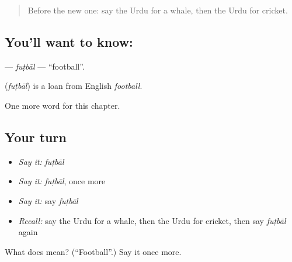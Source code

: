 \label{lesson:UR-C168-futbal}



\begin{quote}
Before the new one: say the Urdu for a whale, then the Urdu for cricket.
\end{quote}

\subsection*{You'll want to know:  }
\textbf{ } — \emph{fuṭbāl} — \textquotedblleft{}football\textquotedblright{}.

\begin{cousinweb}
\textbf{ } (\emph{fuṭbāl}) is a loan from English \emph{football}.
\end{cousinweb}

\begin{grammarlens}[title={What you've built}]
One more word for this chapter.
\end{grammarlens}

\subsection*{Your turn}
\begin{itemize}
\raggedright
  \item \emph{Say it:} \emph{fuṭbāl}
  \item \emph{Say it:} \emph{fuṭbāl}, once more
  \item \emph{Say it:} say \emph{fuṭbāl}
  \item \emph{Recall:} say the Urdu for a whale, then the Urdu for cricket, then say \emph{fuṭbāl} again
\end{itemize}

\begin{tcolorbox}[breakable,colback=teal!4,colframe=teal!35!black,title={Before you move on}]
What does   mean? (\textquotedblleft{}Football\textquotedblright{}.) Say it once more.
\end{tcolorbox}

